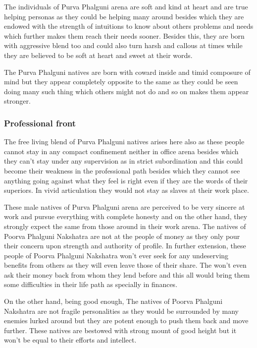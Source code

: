 \documentclass[12pt, right open]{memoir}
\begin{document}
The individuals of Purva Phalguni arena are soft and kind at heart and are true helping personas as they could be helping many around besides which they are endowed with the strength of intuitions to know about others problems and needs which further makes them reach their needs sooner. Besides this, they are born with aggressive blend too and could also turn harsh and callous at times while they are believed to be soft at heart and sweet at their words.

The Purva Phalguni natives are born with coward inside and timid composure of mind but they appear completely opposite to the same as they could be seen doing many such thing which others might not do and so on makes them appear stronger.

\subsubsection{Professional front}

The free living blend of Purva Phalguni natives arises here also as these people  cannot stay in any compact confinement neither in office arena besides which they can’t stay under any supervision as in strict subordination  and this could become their weakness in the professional path besides which they cannot see anything going against what they feel is right even if they are the words of their superiors. In vivid articulation they would not stay as slaves at their work place.

These male natives of Purva Phalguni arena are perceived to be very sincere at work and pursue everything with complete honesty and on the other hand, they strongly expect the same from those around in their work arena. The natives of Poorva Phalguni Nakshatra  are not at the people of money as they only pour their concern upon strength and authority of profile. In further extension, these people of Poorva Phalguni Nakshatra won’t ever seek for any undeserving benefits from others as they will even leave those of their share. The won’t even ask their money back from whom they lend before and this all would bring them some difficulties in their life path as specially in finances.

On the other hand, being good enough, The natives of Poorva Phalguni Nakshatra are not fragile personalities as they would be surrounded by many enemies lurked around but they are potent enough to push them back and move further. These natives are bestowed with strong mount of good height but it won’t be equal to their efforts and intellect.
\end{document}
